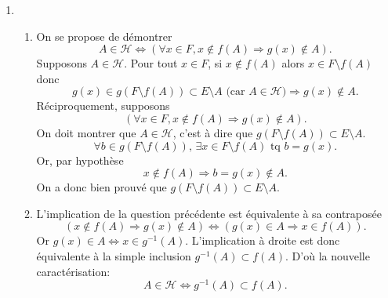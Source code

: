 \begin{enumerate}
  \item 
\begin{enumerate}
  \item On se propose de démontrer
\begin{displaymath}
A \in \mathcal{H} \Leftrightarrow \left( \forall x \in F, x \notin f(A) \Rightarrow g(x) \notin A \right).
\end{displaymath}
Supposons $A \in \mathcal{H}$. Pour tout $x\in F$, si $x\notin f(A)$ alors $x\in F\setminus f(A)$ donc 
\begin{displaymath}
g(x)\in g(F\setminus f(A)) \subset E \setminus A \text{ (car $A \in \mathcal{H}$)} \Rightarrow g(x) \notin A.
\end{displaymath}
Réciproquement, supposons
\begin{displaymath}
\left( \forall x \in F, x \notin f(A) \Rightarrow g(x) \notin A \right) .
\end{displaymath}
On doit montrer que $A \in \mathcal{H}$, c'est à dire que $g(F\setminus f(A))\subset E\setminus A$.
\begin{displaymath}
\forall b \in g(F\setminus f(A)), \,\exists x\in F\setminus f(A) \text{ tq } b = g(x) .  
\end{displaymath}
Or, par hypothèse
\begin{displaymath}
  x\notin f(A) \Rightarrow b = g(x) \notin A .
\end{displaymath}
On a donc bien prouvé que $g(F\setminus f(A))\subset E\setminus A$.
  \item L'implication de la question précédente est équivalente à sa contraposée 
\begin{displaymath}
  \left( x \notin f(A) \Rightarrow g(x) \notin A \right)
  \Leftrightarrow
  \left( g(x) \in A \Rightarrow x \in f(A) \right).
\end{displaymath}
Or $g(x)\in A \Leftrightarrow x \in g^{-1}(A)$. L'implication à droite est donc équivalente à la simple inclusion $g^{-1}(A)\subset f(A)$. D'où la nouvelle caractérisation:
\begin{displaymath}
A \in \mathcal{H} \Leftrightarrow g^{-1}(A)\subset f(A) .
\end{displaymath}
\end{enumerate}


\end{enumerate}
